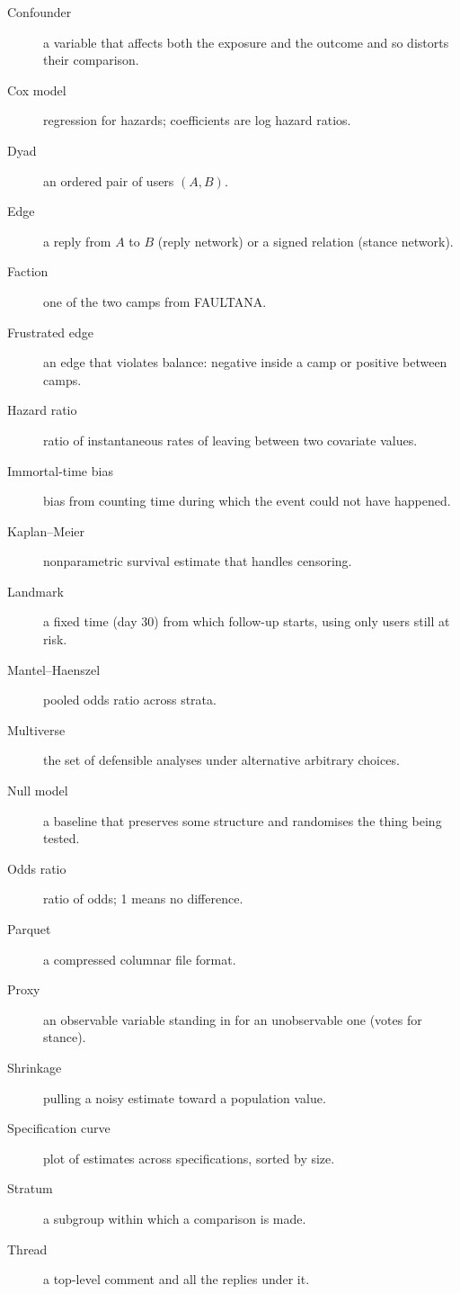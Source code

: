 \begin{description}
  \item[Confounder] a variable that affects both the exposure and the outcome and so distorts their comparison.
  \item[Cox model] regression for hazards; coefficients are log hazard ratios.
  \item[Dyad] an ordered pair of users $(A,B)$.
  \item[Edge] a reply from $A$ to $B$ (reply network) or a signed relation (stance network).
  \item[Faction] one of the two camps from FAULTANA.
  \item[Frustrated edge] an edge that violates balance: negative inside a camp or positive between camps.
  \item[Hazard ratio] ratio of instantaneous rates of leaving between two covariate values.
  \item[Immortal-time bias] bias from counting time during which the event could not have happened.
  \item[Kaplan--Meier] nonparametric survival estimate that handles censoring.
  \item[Landmark] a fixed time (day 30) from which follow-up starts, using only users still at risk.
  \item[Mantel--Haenszel] pooled odds ratio across strata.
  \item[Multiverse] the set of defensible analyses under alternative arbitrary choices.
  \item[Null model] a baseline that preserves some structure and randomises the thing being tested.
  \item[Odds ratio] ratio of odds; 1 means no difference.
  \item[Parquet] a compressed columnar file format.
  \item[Proxy] an observable variable standing in for an unobservable one (votes for stance).
  \item[Shrinkage] pulling a noisy estimate toward a population value.
  \item[Specification curve] plot of estimates across specifications, sorted by size.
  \item[Stratum] a subgroup within which a comparison is made.
  \item[Thread] a top-level comment and all the replies under it.
\end{description}

